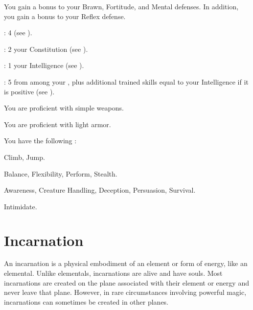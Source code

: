       You gain a  bonus to your Brawn, Fortitude, and Mental defenses.
      In addition, you gain a  bonus to your Reflex defense.

      \begin{raggeditemize}
          \item {}: 4 (see ).
          \item {}: 2 \add your Constitution (see ).
          \item {}: 1 \add your Intelligence (see ).
          \item {}: 5 from among your , plus additional trained skills equal to your Intelligence if it is positive (see ).
      \end{raggeditemize}

      You are proficient with simple weapons.

      You are proficient with light armor.

      You have the following :
      \begin{raggeditemize}
        \item {} Climb, Jump.
        \item {} Balance, Flexibility, Perform, Stealth.
        \item {} Awareness, Creature Handling, Deception, Persuasion, Survival.
        \item {} Intimidate.
      \end{raggeditemize}

\section{Incarnation}

  An incarnation is a physical embodiment of an element or form of energy, like an elemental.
  Unlike elementals, incarnations are alive and have souls.
  Most incarnations are created on the plane associated with their element or energy and never leave that plane.
  However, in rare circumstances involving powerful magic, incarnations can sometimes be created in other planes.

